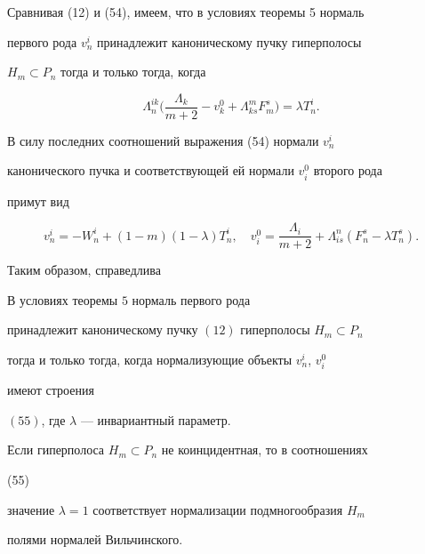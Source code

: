 Сравнивая (12) и (54), имеем, что в условиях теоремы 5 нормаль  


первого рода $v^i_n$ принадлежит каноническому пучку гиперполосы  


$H_m\subset P_n$ тогда и только тогда, когда 


$$ 


\Lambda^{i k}_n\bigg(\frac{\Lambda_k}{m+2}-v^0_k+ 


\Lambda^m_{k s}F^s_m\bigg)=\lambda T^i_n. 


$$ 


 


В силу последних соотношений выражения (54) нормали $v^i_n$ 


канонического пучка и соответствующей ей нормали $v^0_i$ второго рода  


примут вид 


\begin{equation} 


v^i_n=-W^i_n+(1-m)(1-\lambda)T^i_n,\quad 


v^0_i=\frac{\Lambda_i}{m+2}+\Lambda^n_{is} 


(F^s_n-\lambda T^s_n). 


\end{equation} 


 


Таким образом, справедлива 


 


\begin{thm} В условиях теоремы $5$ нормаль первого рода  


принадлежит каноническому пучку $(12)$ гиперполосы $H_m\subset P_n$ 


тогда и только тогда, когда нормализующие объекты $v^i_n$, $v^0_i$ 


имеют строения 


$(55)$, где $\lambda$ --- инвариантный параметр. 


\end{thm} 


 


Если гиперполоса $H_m\subset P_n$ не коинцидентная, то в соотношениях 


(55) 


значение $\lambda=1$ соответствует нормализации подмногообразия $H_m$ 


полями нормалей Вильчинского. 


